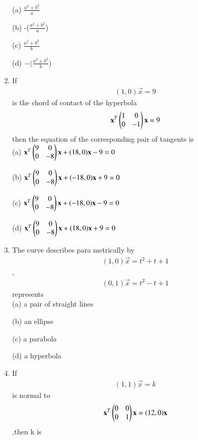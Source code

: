 \documentclass[journal,12pt,twocolumn]{IEEEtran}
\begin{document}
\begin{enumerate}
    \choice (a) $\frac{a^2+b^2}{a}$
    
     \choice (b) -($\frac{a^2+b^2}{a}$)
    
    \choice (c) $\frac{a^2+b^2}{b}$
    
    \choice (d) $-(\frac{a^2+b^2}{b}$)\\
    
    \item If \begin{align}(1,0)\vec x=9\end{align} is the chord of contact of the hyperbola \begin{align}\mathbf x^T \begin{pmatrix}1&0 \\ 0&-1\end{pmatrix}\mathbf x=9\end{align} then the equation of the corresponding pair of tangents is\\
    
    \choice (a) $\mathbf x^T \begin{pmatrix}9&0 \\ 0&-8\end{pmatrix}\mathbf x+(18,0)\mathbf x-9=0$
    
    \choice (b) $\mathbf x^T \begin{pmatrix}9&0 \\ 0&-8\end{pmatrix}\mathbf x+(-18,0)\mathbf x+9=0$

    \choice (c) $\mathbf x^T \begin{pmatrix}9&0 \\ 0&-8\end{pmatrix}\mathbf x+(-18,0)\mathbf x-9=0$

   \choice (d) $\mathbf x^T \begin{pmatrix} 9&0 \\ 0&-8\end{pmatrix}\mathbf x+(18,0)\mathbf x+9=0$\\

\item The curve describes para metrically by \begin{align}(1,0)\vec x=t^2+t+1\end{align},\begin{align}(0,1)\vec x=t^2-t+1\end{align} represents\\

\choice (a) a pair of straight lines 

\choice (b) an ellipse

\choice (c) a parabola

\choice (d) a hyperbola\\

\item If \begin{align}(1,1)\vec x=k\end{align} is normal to \begin{align}\mathbf x^T\begin{pmatrix}0 & 0 \\0 & 1\end{pmatrix} \mathbf x=(12,0)\mathbf x \end{align},then k is \\
    

\end{enumerate}
\end{document}
